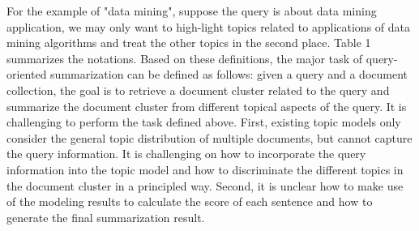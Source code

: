 For the example of "data mining", suppose the query is about data mining application, we may only want to high-light topics related to applications of data mining algorithms
and treat the other topics in the second place. Table 1 summarizes the notations.
Based on these definitions, the major task of query-oriented summarization can be defined as follows: given a query and a document collection, the goal is to retrieve a
document cluster related to the query and summarize the document cluster from different topical aspects of the query. It is challenging to perform the task defined above.
First, existing topic models only consider the general topic distribution of multiple documents, but cannot capture the query information. It is challenging on how to incorporate the query information into the topic model and how to discriminate the different topics in the document cluster in a principled way. Second, it is unclear how to make use of the modeling results to calculate the score of each sentence and how to generate the final summarization result.